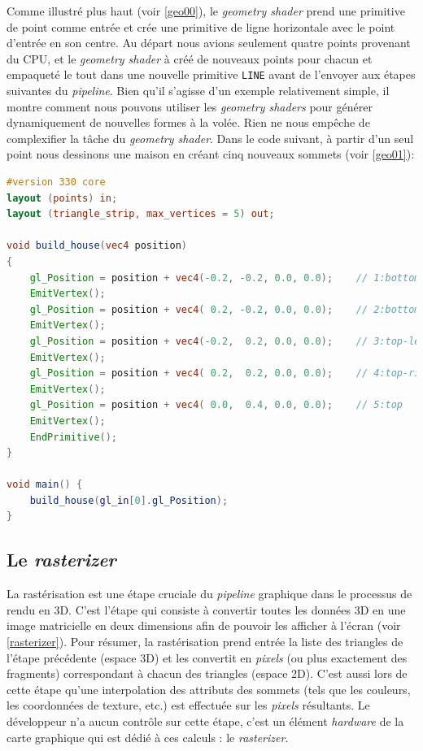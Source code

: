 Comme illustré plus haut (voir \ref{geo00}), le \textit{geometry shader} prend une primitive de point comme entrée et crée une primitive de ligne horizontale avec le point d'entrée en son centre. Au départ nous avions seulement quatre points provenant du CPU, et le \textit{geometry shader} à créé de nouveaux points pour chacun et empaqueté le tout dans une nouvelle primitive \lstinline{LINE} avant de l'envoyer aux étapes suivantes du \textit{pipeline}. Bien qu'il s'agisse d'un exemple relativement simple, il montre comment nous pouvons utiliser les \textit{geometry shaders} pour générer dynamiquement de nouvelles formes à la volée. Rien ne nous empêche de complexifier la tâche du \textit{geometry shader}. Dans le code suivant, à partir d'un seul point nous dessinons une maison en créant cinq nouveaux sommets (voir \ref{geo01}):

\begin{minipage}{\linewidth}
\begin{lstlisting}[language=GLSL, caption=\textit{Geometry shader} en GLSL - Maison à partir d'un seul \textit{vertex}]
#version 330 core
layout (points) in;
layout (triangle_strip, max_vertices = 5) out;

void build_house(vec4 position)
{    
    gl_Position = position + vec4(-0.2, -0.2, 0.0, 0.0);    // 1:bottom-left
    EmitVertex();   
    gl_Position = position + vec4( 0.2, -0.2, 0.0, 0.0);    // 2:bottom-right
    EmitVertex();
    gl_Position = position + vec4(-0.2,  0.2, 0.0, 0.0);    // 3:top-left
    EmitVertex();
    gl_Position = position + vec4( 0.2,  0.2, 0.0, 0.0);    // 4:top-right
    EmitVertex();
    gl_Position = position + vec4( 0.0,  0.4, 0.0, 0.0);    // 5:top
    EmitVertex();
    EndPrimitive();
}

void main() {    
    build_house(gl_in[0].gl_Position);
}  
\end{lstlisting}
\end{minipage}



\subsection*{Le \textit{rasterizer}}
La rastérisation est une étape cruciale du \textit{pipeline} graphique dans le processus de rendu en 3D. C'est l'étape qui consiste à convertir toutes les données 3D en une image matricielle en deux dimensions afin de pouvoir les afficher à l'écran (voir \ref{rasterizer}). Pour résumer, la rastérisation prend entrée la liste des triangles de l'étape précédente (espace 3D) et les convertit en \textit{pixels} (ou plus exactement des fragments) correspondant à chacun des triangles (espace 2D). C'est aussi lors de cette étape qu'une interpolation des attributs des sommets (tels que les couleurs, les coordonnées de texture, etc.) est effectuée sur les \textit{pixels} résultants. Le développeur n'a aucun contrôle sur cette étape, c'est un élément \textit{hardware} de la carte graphique qui est dédié à ces calculs : le \textit{rasterizer}.



